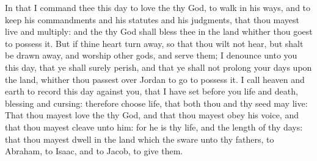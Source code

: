 \begin{biblechapter}
\verse In that I command thee this day to love the \LORD thy God, to walk in his ways, and to keep his commandments and his statutes and his judgments, that thou mayest live and multiply: and the \LORD thy God shall bless thee in the land whither thou goest to possess it.
\verse But if thine heart turn away, so that thou wilt not hear, but shalt be drawn away, and worship other gods, and serve them;
\verse I denounce unto you this day, that ye shall surely perish, and that ye shall not prolong your days upon the land, whither thou passest over Jordan to go to possess it.
\verse I call heaven and earth to record this day against you, that I have set before you life and death, blessing and cursing: therefore choose life, that both thou and thy seed may live:
\verse That thou mayest love the \LORD thy God, and that thou mayest obey his voice, and that thou mayest cleave unto him: for he is thy life, and the length of thy days: that thou mayest dwell in the land which the \LORD sware unto thy fathers, to Abraham, to Isaac, and to Jacob, to give them.
\end{biblechapter}

